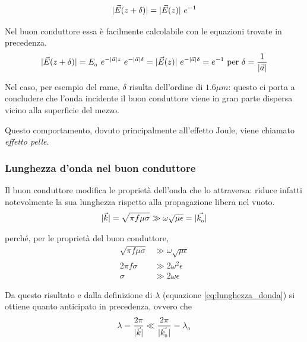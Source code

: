 		\begin{equation*}
			|\vec{E}(z + \delta)| = |\vec{E}(z)| ~ e^{-1}
		\end{equation*}

		Nel buon conduttore essa è facilmente calcolabile con le equazioni trovate in precedenza.
		\begin{equation} \begin{split} \label{eq:spessore_penetrazione}
			|\vec{E}(z + \delta)| = E_{_{0}} ~ e^{-|\vec{a}| z} ~ e^{-|\vec{a}| \delta} = |\vec{E}(z)| ~ e^{-|\vec{a}| \delta} = e^{-1} \text{ per } \delta = \frac{1}{|\vec{a}|}
		\end{split} \end{equation}

		Nel caso, per esempio del rame, $\delta$ risulta dell'ordine di $1.6 \mu m$: questo ci porta a concludere che l'onda incidente il buon conduttore viene in gran parte dispersa vicino alla superficie del mezzo.

		Questo comportamento, dovuto principalmente all'effetto Joule, viene chiamato \emph{effetto pelle}.
		\subsubsection{Lunghezza d'onda nel buon conduttore}
		Il buon conduttore modifica le proprietà dell'onda che lo attraversa: riduce infatti notevolmente la sua lunghezza rispetto alla propagazione libera nel vuoto.
		\begin{equation*} \begin{split}
			& |\vec{k}|
				= \sqrt{\pi f \mu \sigma}
				\gg \omega \sqrt{\mu \epsilon}
				= |\vec{k_{_{0}}}| \\
		\end{split} \end{equation*}

		perché, per le proprietà del buon conduttore,
		\begin{equation*} \begin{split}
				\sqrt{\pi f \mu \sigma} &\gg \omega \sqrt{\mu \epsilon} \\
				2 \pi f \sigma &\gg 2 \omega^2 \epsilon \\
				\sigma &\gg 2 \omega \epsilon
		\end{split} \end{equation*}

		Da questo risultato e dalla definizione di $\lambda$ (equazione \eqref{eq:lunghezza_donda}) si ottiene quanto anticipato in precedenza, ovvero che
		\begin{equation*} \begin{split}
			& \lambda = \frac{2\pi}{|\vec{k}|} \ll \frac{2\pi}{|\vec{k_{_{0}}}|} = \lambda_{_{0}} \\
		\end{split} \end{equation*}

